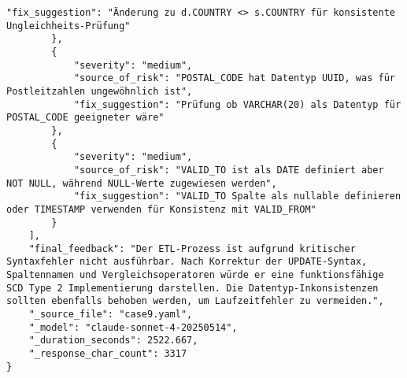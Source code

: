 \begin{lstlisting}[caption={Ausgabe: Claude Sonnet 4 Anwendungsfall 9 Robustheitsdurchlauf},label={claude_case9_prompt3}]
            "fix_suggestion": "Änderung zu d.COUNTRY <> s.COUNTRY für konsistente Ungleichheits-Prüfung"
        },
        {
            "severity": "medium",
            "source_of_risk": "POSTAL_CODE hat Datentyp UUID, was für Postleitzahlen ungewöhnlich ist",
            "fix_suggestion": "Prüfung ob VARCHAR(20) als Datentyp für POSTAL_CODE geeigneter wäre"
        },
        {
            "severity": "medium",
            "source_of_risk": "VALID_TO ist als DATE definiert aber NOT NULL, während NULL-Werte zugewiesen werden",
            "fix_suggestion": "VALID_TO Spalte als nullable definieren oder TIMESTAMP verwenden für Konsistenz mit VALID_FROM"
        }
    ],
    "final_feedback": "Der ETL-Prozess ist aufgrund kritischer Syntaxfehler nicht ausführbar. Nach Korrektur der UPDATE-Syntax, Spaltennamen und Vergleichsoperatoren würde er eine funktionsfähige SCD Type 2 Implementierung darstellen. Die Datentyp-Inkonsistenzen sollten ebenfalls behoben werden, um Laufzeitfehler zu vermeiden.",
    "_source_file": "case9.yaml",
    "_model": "claude-sonnet-4-20250514",
    "_duration_seconds": 2522.667,
    "_response_char_count": 3317
}
\end{lstlisting}


